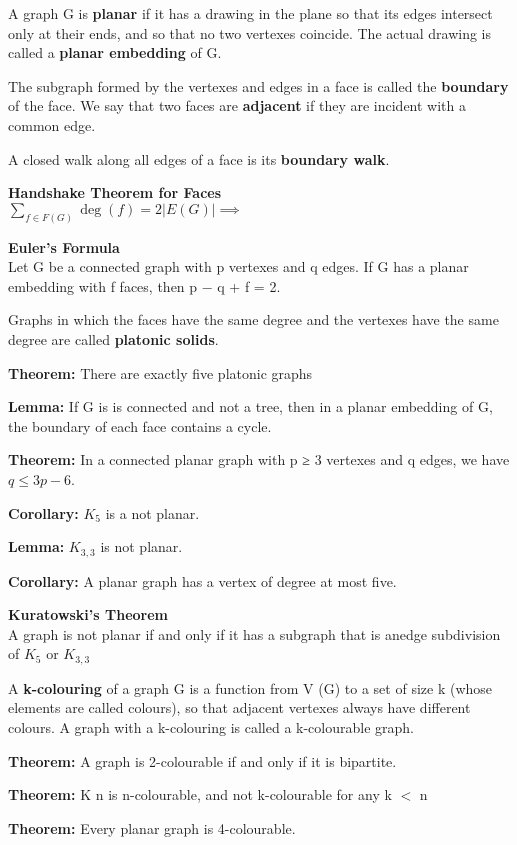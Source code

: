 \documentclass[12pt]{article}
\begin{document}
A graph G is \textbf{planar} if it has a drawing in the plane so that its edges intersect only at their ends, and so that no two vertexes coincide. The actual drawing is called a \textbf{planar embedding} of G.

The subgraph formed by the vertexes and edges in a face is called the \textbf{boundary} of the face. We say that two faces are \textbf{adjacent} if they are incident with a common edge.

A closed walk along all edges of a face is its \textbf{boundary walk}.

\textbf{Handshake Theorem for Faces}\\
$\displaystyle\sum_{f\in F(G)} \deg(f) = 2|E(G)| \implies$

\textbf{Euler’s Formula}\\
Let G be a connected graph with p vertexes and q edges. If G has a planar embedding with f faces, then p − q + f = 2.

Graphs in which the faces have the same degree and the vertexes have the same degree are called \textbf{platonic solids}.

\textbf{Theorem:} There are exactly five platonic graphs

\textbf{Lemma:} If G is is connected and not a tree, then in a planar embedding of G, the boundary of each face contains a cycle.

\textbf{Theorem:} In a connected planar graph with p ≥ 3 vertexes and q edges, we have $q \leq 3p − 6$.

\textbf{Corollary:} $K_5$ is a not planar.

\textbf{Lemma:} $K_{3,3}$ is not planar.

\textbf{Corollary:} A planar graph has a vertex of degree at most five.

\textbf{Kuratowski’s Theorem}\\
A graph is not planar if and only if it has a subgraph that is anedge subdivision of $K_5$  or $K_{3,3}$


A \textbf{k-colouring} of a graph G is a function from V (G) to a set of size k (whose elements are called colours), so that adjacent vertexes always have different colours. A graph with a k-colouring is called a k-colourable graph.

\textbf{Theorem:} A graph is 2-colourable if and only if it is bipartite.

\textbf{Theorem:} K n is n-colourable, and not k-colourable for any k $<$ n

\textbf{Theorem:} Every planar graph is 4-colourable.
\end{document}

